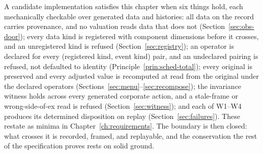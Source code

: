 A candidate implementation satisfies this chapter when six things hold, each mechanically
checkable over generated data and histories: all data on the record carries provenance,
and no valuation reads data that does not (Section~\ref{sec:obs-door}); every data kind
is registered with component dimensions before it crosses, and an unregistered kind is
refused (Section~\ref{sec:registry}); an operator is declared for every (registered kind,
event kind) pair, and an undeclared pairing is refused, not defaulted to identity
(Principle~\ref{prin:sched-total}); every original is preserved and every adjusted value is
recomputed at read from the original under the declared operators
(Sections~\ref{sec:menu}--\ref{sec:recompose}); the invariance witness holds across every
generated corporate action, and a stale-frame or wrong-side-of-ex read is refused
(Section~\ref{sec:witness}); and each of W1--W4 produces its determined disposition on
replay (Section~\ref{sec:failures}). These restate as minima in
Chapter~\ref{ch:requirements}. The boundary is then closed: what crosses it is recorded,
framed, and replayable, and the conservation the rest of the specification proves rests on
solid ground.
